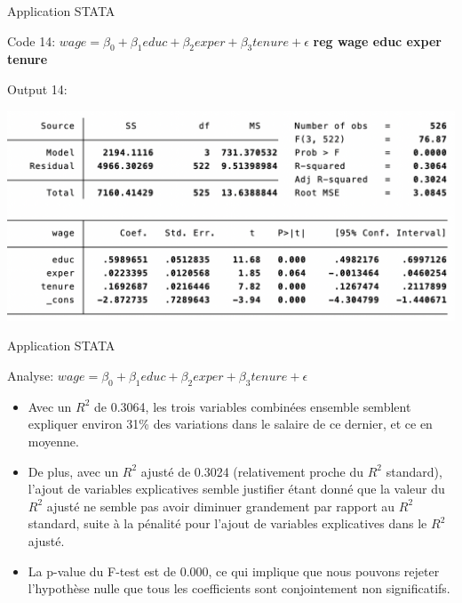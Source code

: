 \documentclass{beamer}
\begin{document}
\begin{frame}{Application STATA}
\begin{block}{Code 14: $wage = \beta_0 + \beta_1 educ +\beta_2 exper + \beta_3 tenure  + \epsilon$}
\textbf{reg wage educ exper tenure}
\end{block}

\begin{block}{Output 14:}
\begin{center}
\includegraphics[scale=.5]{REG4.png}
\end{center}
\end{block}
\end{frame}

\begin{frame}{Application STATA}
\begin{block}{Analyse: $wage = \beta_0 + \beta_1 educ +\beta_2 exper + \beta_3 tenure  + \epsilon$}
\begin{itemize}
\item Avec un $R^2$ de 0.3064, les trois variables combinées ensemble semblent expliquer environ 31\% des variations dans le salaire de ce dernier, et ce en moyenne.
\item De plus, avec un $R^2$ ajusté de 0.3024 (relativement proche du $R^2$ standard), l'ajout de variables explicatives semble justifier étant donné que la valeur du $R^2$ ajusté ne semble pas avoir diminuer grandement par rapport au $R^2$ standard, suite à la pénalité pour l'ajout de variables explicatives dans le $R^2$ ajusté.
\item La p-value du F-test est de 0.000, ce qui implique que nous pouvons rejeter l'hypothèse nulle que tous les coefficients sont conjointement non significatifs. 
\end{itemize}
\end{block}
\end{frame}
\end{document}
